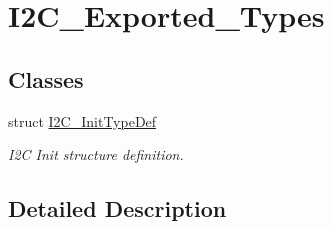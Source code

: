 \hypertarget{group___i2_c___exported___types}{}\section{I2\+C\+\_\+\+Exported\+\_\+\+Types}
\label{group___i2_c___exported___types}
\subsection*{Classes}
\begin{DoxyCompactItemize}
\item 
struct \hyperlink{struct_i2_c___init_type_def}{I2\+C\+\_\+\+Init\+Type\+Def}
\begin{DoxyCompactList}\small\item\em I2C Init structure definition. \end{DoxyCompactList}\end{DoxyCompactItemize}


\subsection{Detailed Description}
